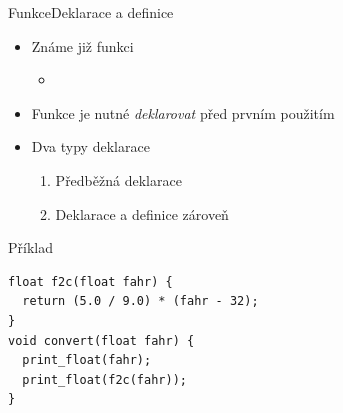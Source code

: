 \begin{frame}[fragile]{Funkce}{Deklarace a definice}

  \begin{itemize}
    \item Známe již funkci 
    \begin{itemize}
      \item {}
    \end{itemize}

    \pause

    \item Funkce je nutné \emph{deklarovat} před prvním použitím

    \pause

    \item Dva typy deklarace
    \begin{enumerate}
      \item Předběžná deklarace
      \item Deklarace a definice zároveň
    \end{enumerate}

  \end{itemize}


\begin{block}{Příklad}
\begin{lstlisting}
float f2c(float fahr) {
  return (5.0 / 9.0) * (fahr - 32);
}
void convert(float fahr) {
  print_float(fahr);
  print_float(f2c(fahr));
}
\end{lstlisting}
\end{block}

\end{frame}

